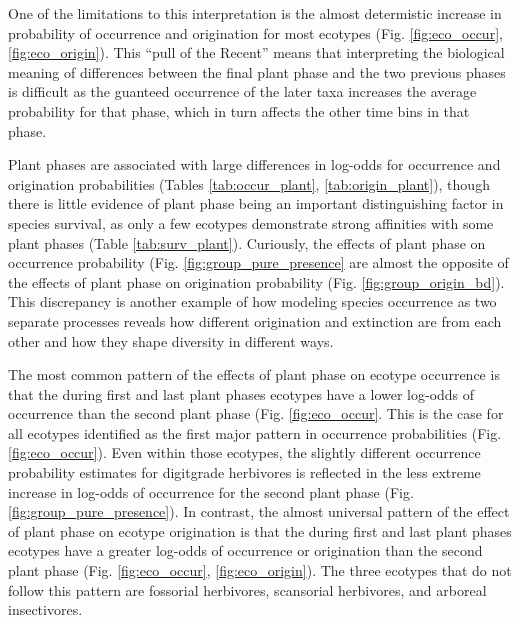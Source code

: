 \documentclass[12pt,letterpaper]{article}
\begin{document}
One of the limitations to this interpretation is the almost determistic increase in probability of occurrence and origination for most ecotypes (Fig. \ref{fig:eco_occur}, \ref{fig:eco_origin}). This ``pull of the Recent'' means that interpreting the biological meaning of differences between the final plant phase and the two previous phases is difficult as the guanteed occurrence of the later taxa increases the average probability for that phase, which in turn affects the other time bins in that phase.

Plant phases are associated with large differences in log-odds for occurrence and origination probabilities (Tables \ref{tab:occur_plant}, \ref{tab:origin_plant}), though there is little evidence of plant phase being an important distinguishing factor in species survival, as only a few ecotypes demonstrate strong affinities with some plant phases (Table \ref{tab:surv_plant}). 
Curiously, the effects of plant phase on occurrence probability (Fig. \ref{fig:group_pure_presence} are almost the opposite of the effects of plant phase on origination probability (Fig. \ref{fig:group_origin_bd}). This discrepancy is another example of how modeling species occurrence as two separate processes reveals how different origination and extinction are from each other and how they shape diversity in different ways.

The most common pattern of the effects of plant phase on ecotype occurrence is that the during first and last plant phases ecotypes have a lower log-odds of occurrence than the second plant phase (Fig. \ref{fig:eco_occur}. This is the case for all ecotypes identified as the first major pattern in occurrence probabilities (Fig. \ref{fig:eco_occur}). Even within those ecotypes, the slightly different occurrence probability estimates for digitgrade herbivores is reflected in the less extreme increase in log-odds of occurrence for the second plant phase (Fig. \ref{fig:group_pure_presence}). In contrast, the almost universal pattern of the effect of plant phase on ecotype origination is that the during first and last plant phases ecotypes have a greater log-odds of occurrence or origination than the second plant phase (Fig. \ref{fig:eco_occur}, \ref{fig:eco_origin}). The three ecotypes that do not follow this pattern are fossorial herbivores, scansorial herbivores, and arboreal insectivores.

\end{document}
